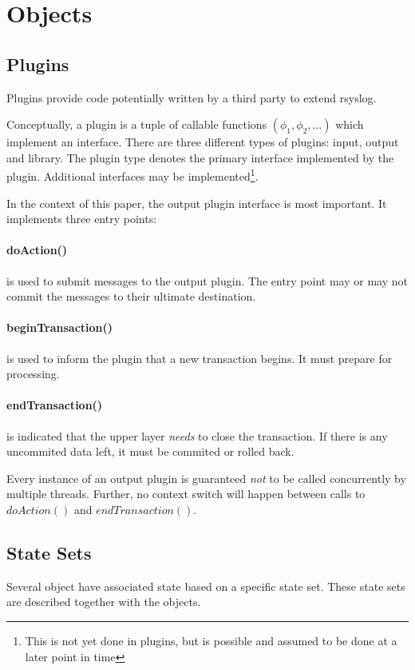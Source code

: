 \documentclass[a4paper,10pt]{article}
\begin{document}
\section{Objects}
\subsection{Plugins}
Plugins provide code potentially written by a third party to extend rsyslog.

Conceptually, a plugin is a tuple of callable functions $(\phi_1, \phi_2, \ldots)$ which implement an interface. There are three different types of plugins: input, output and library. The plugin type denotes the primary interface implemented by the plugin. Additional interfaces may be implemented\footnote{This is not yet done in plugins, but is possible and assumed to be done at a later point in time}.

In the context of this paper, the output plugin interface is most important. It implements three entry points:

\paragraph{doAction()}
is used to submit messages to the output plugin. The entry point may or may not commit the messages to their ultimate destination.

\paragraph{beginTransaction()}
is used to inform the plugin that a new transaction begins. It must prepare for processing.

\paragraph{endTransaction()}
is indicated that the upper layer \emph{needs} to close the transaction. If there is any uncommited data left, it must be commited or rolled back.

Every instance of an output plugin is guaranteed \emph{not} to be called concurrently by multiple threads. Further, no context switch will happen between calls to $doAction()$ and $endTransaction()$.

\subsection{State Sets}
Several object have associated state based on a specific state set. These state sets are described together with the objects.
\end{document}
